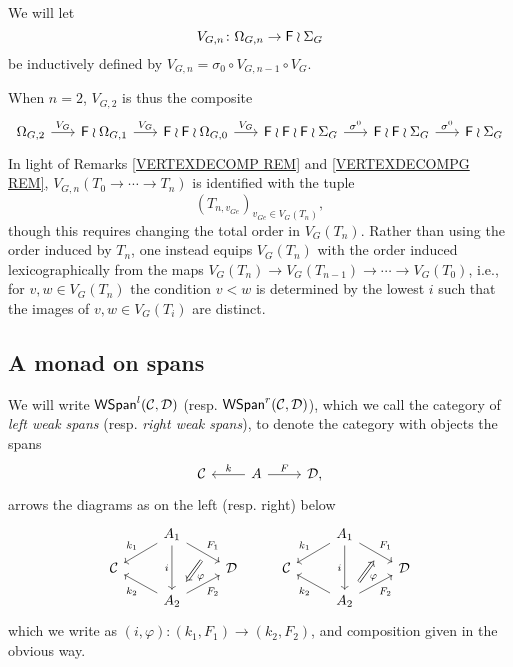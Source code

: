 \documentclass[a4paper,10pt]{article}%
\begin{document}
\begin{notation}\label{INDVNG NOT}
	We will let 
\[
	V_{G,n} \colon \Omega_{G,n} \to \mathsf{F} \wr \Sigma_G
\]
be inductively defined by 
$V_{G,n} = \sigma_0 \circ V_{G,n-1} \circ V_G$.
\end{notation}

\begin{remark}
When $n = 2$, $V_{G,2}$ is thus the composite
\[
\begin{tikzcd}[column sep =1.7em]
	\Omega_{G,2} \ar{r}{V_G} &
	\Fin \wr \Omega_{G,1} \ar{r}{V_G} &
	\Fin \wr \Fin \wr \Omega_{G,0} \ar{r}{V_G} &
	\Fin \wr \Fin \wr \Fin \wr \Sigma_{G} \ar{r}{\sigma^0} &
	\Fin \wr \Fin \wr \Sigma_{G} \ar{r}{\sigma^0} &
	\Fin \wr \Sigma_{G}
\end{tikzcd}
\]
In light of Remarks \ref{VERTEXDECOMP REM} and \ref{VERTEXDECOMPG REM}, 
$V_{G,n}(T_0 \to \cdots \to T_n)$ is identified with the tuple 
\begin{equation}\label{VGNISO EQ}
	(T_{n,v_{G e}})_{v_{G e} \in V_G(T_n)},
\end{equation}
though this requires changing the total order in $V_G(T_n)$. Rather than using the order induced by $T_n$, one instead equips 
$V_G(T_n)$ with the order induced lexicographically
from the maps 
$V_G(T_n) \to V_G(T_{n-1}) \to \cdots \to V_G(T_0)$, i.e., for 
$v,w \in V_G(T_n)$ the condition $v<w$ is determined by the lowest $i$ such that the images of $v,w \in V_G(T_i)$ are distinct.
\end{remark}




\subsection{A monad on spans}

\begin{definition}\label{WSPAN DEF}
We will write 
$\mathsf{WSpan}^l(\mathcal{C},\mathcal{D})$
(resp.
$\mathsf{WSpan}^r(\mathcal{C},\mathcal{D})$),
which we call the category of  \textit{left weak spans} (resp. \textit{right weak spans}),
to denote the category with objects the spans
\[
\begin{tikzcd}
\C & A \ar{l}[swap]{k} \ar{r}{F} & \D,
\end{tikzcd}
\]
arrows the diagrams as on the left (resp. right) below \begin{equation}\label{TWISTEDARROWRIGHT EQ}
	\begin{tikzcd}[row sep=small]
	&
	A_1 \ar{dl}[swap,name=k1]{k_1} \ar{dr}[name=F11]{F_1} \ar{dd}[swap]{i} & &
	&
	A_1 \ar{dl}[swap,name=k1]{k_1} \ar{dr}[name=F1]{F_1} \ar{dd}[swap]{i} 
\\
	\C & & \D &
	\C & & \D 
\\
		& |[alias=G21]| A_2  \ar{ul}{k_2} \ar{ur}[swap]{F_2} & &
		& |[alias=G2]| A_2  \ar{ul}{k_2} \ar{ur}[swap]{F_2} &
		\arrow[Leftarrow, from=F1, to=G2,shorten >=0.25cm,shorten <=0.25cm,"\varphi"]
		\arrow[Rightarrow, from=F11, to=G21,shorten >=0.25cm,shorten <=0.25cm,"\varphi"]
	\end{tikzcd}
\end{equation}
which we write as $(i,\varphi) \colon (k_1,F_1) \to (k_2,F_2)$, and composition given in the obvious way.
\end{definition}
\end{document}
